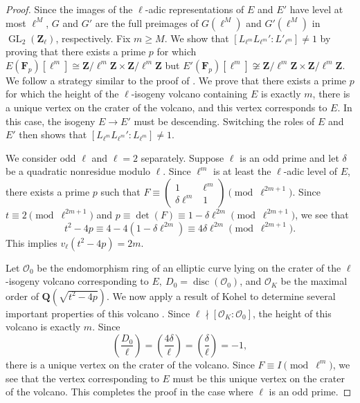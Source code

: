 \documentclass{amsart}
\newcommand{\Z}{\mathbf{Z}}
\newcommand{\F}{\mathbf{F}}
\newcommand{\Q}{\mathbf{Q}}
\newcommand{\GL}{\operatorname{GL}}
\newcommand{\disc}{\operatorname{disc}}
\newcommand{\legen}[2]{\ensuremath{\left( \frac{#1}{#2} \right) }}
\numberwithin{equation}{section}
\theoremstyle{plain}
\theoremstyle{remark}
\begin{document}
\begin{proof}
Since the images of the $\ell$-adic representations of $E$ and $E'$ have level at most $\ell^M$, $G$ and $G'$ are the full preimages of $G(\ell^M)$ and $G'(\ell^M)$ in $\GL_2(\Z_\ell)$, respectively.  Fix $m \geq M$. We show that $[L_{\ell^m}L_{\ell^m}':L'_{\ell^m}] \ne 1$ by proving that there exists a prime $p$ for which $E(\F_p)[\ell^m] \cong \Z/\ell^m \Z \times \Z/\ell^m \Z$ but $E'(\F_p)[\ell^m] \not \cong \Z/\ell^m \Z \times \Z/\ell^m \Z$.  We follow a strategy similar to the proof of \cite[Theorem 5.2.4]{ck}.  We prove that there exists a prime $p$ for which the height of the $\ell$-isogeny volcano containing $E$ is exactly $m$, there is a unique vertex on the crater of the volcano, and this vertex corresponds to $E$.  In this case, the isogeny $E \to E'$ must be descending.  Switching the roles of $E$ and $E'$ then shows that $[L_{\ell^m}L_{\ell^m}':L_{\ell^m}] \ne 1$.

We consider odd $\ell$ and $\ell = 2$ separately.  Suppose $\ell$ is an odd prime and let $\delta$ be a quadratic nonresidue modulo $\ell$.  Since $\ell^m$ is at least the $\ell$-adic level of $E$, there exists a prime $p$ such that $F \equiv \left( \begin{smallmatrix} 1 & \ell^{m} \\  \delta \ell^m & 1 \end{smallmatrix} \right) \pmod{\ell^{2m+1}}$.  Since $t \equiv 2\pmod{\ell^{2m+1}}$ and $p \equiv \det(F) \equiv 1-\delta \ell^{2m} \pmod{\ell^{2m+1}}$, we see that 
\[
t^2 - 4p \equiv 4 - 4(1-\delta \ell^{2m}) \equiv 4 \delta \ell^{2m} \pmod{\ell^{2m+1}}.
\]
This implies $v_\ell(t^2-4p) = 2m$.  

Let $\mathcal{O}_0$ be the endomorphism ring of an elliptic curve lying on the crater of the $\ell$-isogeny volcano corresponding to $E,\ D_0 = \disc(\mathcal{O}_0)$, and $\mathcal{O}_K$ be the maximal order of $\Q(\sqrt{t^2-4p})$.  We now apply a result of Kohel to determine several important properties of this volcano \cite[Thm.~7]{sutherland}. Since $\ell \nmid [\mathcal{O}_K \colon \mathcal{O}_0]$, the height of this volcano is exactly $m$.  Since 
\[
\legen{D_0}{\ell} = \legen{4\delta}{\ell} = \legen{\delta}{\ell} = -1,
\] 
there is a unique vertex on the crater of the volcano.  Since $F \equiv I \pmod{\ell^{m}}$, we see that the vertex corresponding to $E$ must be this unique vertex on the crater of the volcano.  This completes the proof in the case where $\ell$ is an odd prime.


\end{proof}
\end{document}
